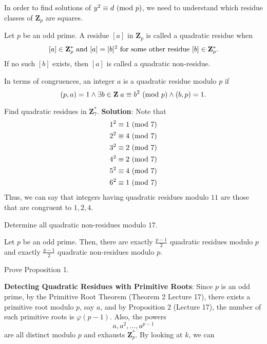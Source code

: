 In order to find solutions of $ y^2\equiv d\ (\mathrm{mod}\ p) $, we need to understand which residue classes
of $ \mathbf{Z}_p $ are squares.
\begin{Definition}{}{}
    Let $ p $ be an odd prime. A residue $ [a] $ in $ \mathbf{Z}_p $ is called a quadratic residue when
    \[ [a]\in\mathbf{Z}_p^*\text{ and $ [a]=[b]^2 $ for some other residue $ [b]\in\mathbf{Z}_p^* $.} \]
    If no such $ [b] $ exists, then $ [a] $ is called a quadratic non-residue.

    In terms of congruences, an integer $ a $ is a quadratic residue modulo $ p $ if
    \[ (p,a)=1\land \exists b\in\mathbf{Z}\; a\equiv b^2\ (\mathrm{mod}\ p)\land (b,p)=1. \]
\end{Definition}
\begin{Example}{}{}
    Find quadratic residues in $ \mathbf{Z}_7^* $.
    \tcblower{}
    \textbf{Solution}: Note that
    \begin{align*}
        1^2 & \equiv 1\ (\mathrm{mod}\ 7) \\
        2^2 & \equiv 4\ (\mathrm{mod}\ 7) \\
        3^2 & \equiv 2\ (\mathrm{mod}\ 7) \\
        4^2 & \equiv 2\ (\mathrm{mod}\ 7) \\
        5^2 & \equiv 4\ (\mathrm{mod}\ 7) \\
        6^2 & \equiv 1\ (\mathrm{mod}\ 7)
    \end{align*}
    Thus, we can say that integers having quadratic residues modulo $ 11 $ are those that
    are congruent to $ 1,2,4 $.
\end{Example}
\begin{Exercise}{}{}
    Determine all quadratic non-residues modulo $ 17 $.
\end{Exercise}
\begin{Proposition}{}{}
    Let $ p $ be an odd prime. Then, there are exactly $ \frac{p-1}{2} $ quadratic residues
    modulo $ p $ and exactly $ \frac{p-1}{2} $ quadratic non-residues modulo $ p $.
\end{Proposition}
\begin{Exercise}{}{}
    Prove Proposition 1.
\end{Exercise}
\textbf{Detecting Quadratic Residues with Primitive Roots}:
Since $ p $ is an odd prime, by the Primitive Root Theorem (Theorem 2 Lecture 17),
there exists a primitive root modulo $ p $, say $ a $, and by Proposition 2 (Lecture 17),
the number of such primitive roots is $ \varphi(p-1) $. Also, the powers
\[ a,a^2,\ldots,a^{p-1} \]
are all distinct modulo $ p $ and exhausts $ \mathbf{Z}_p^* $. By looking at $ k $, we can

